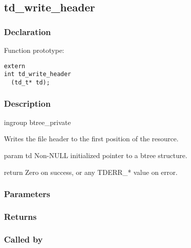 
\newpage
\subsection{td\_write\_header}
\subsubsection{Declaration} Function prototype:

\begin{verbatim}
extern
int td_write_header
  (td_t* td);
\end{verbatim}

\subsubsection{Description}


 ingroup btree\_private

 Writes the file header to the first position of the resource.

 param td Non-NULL initialized pointer to a btree structure.

 return Zero on success, or any TDERR\_* value on error.
 

\subsubsection{Parameters}
\subsubsection{Returns}
\subsubsection{Called by}
